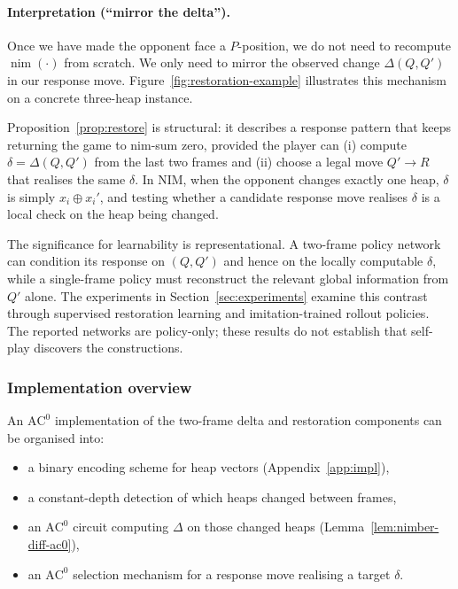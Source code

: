\documentclass[twoside,11pt]{article}
\newcommand{\AC}{\mathrm{AC}}
\numberwithin{theorem}{section}
\numberwithin{equation}{section}
\begin{document}
\paragraph{Interpretation (``mirror the delta'').}
Once we have made the opponent face a $P$-position, we do not need to recompute $\operatorname{nim}(\cdot)$ from scratch. We only need to mirror the observed change $\Delta(Q,Q')$ in our response move.
Figure~\ref{fig:restoration-example} illustrates this mechanism on a concrete three-heap instance.

Proposition~\ref{prop:restore} is structural: it describes a response pattern that keeps returning the game to nim-sum zero, provided the player can (i) compute $\delta=\Delta(Q,Q')$ from the last two frames and (ii) choose a legal move $Q'\to R$ that realises the same $\delta$. In NIM, when the opponent changes exactly one heap, $\delta$ is simply $x_i\oplus x_i'$, and testing whether a candidate response move realises $\delta$ is a local check on the heap being changed.

The significance for learnability is representational. A two-frame policy network can condition its response on $(Q,Q')$ and hence on the locally computable $\delta$, while a single-frame policy must reconstruct the relevant global information from $Q'$ alone. The experiments in Section~\ref{sec:experiments} examine this contrast through supervised restoration learning and imitation-trained rollout policies. The reported networks are policy-only; these results do not establish that self-play discovers the constructions.

\subsubsection{Implementation overview}
An $\AC^0$ implementation of the two-frame delta and restoration components can be organised into:
\begin{itemize}[leftmargin=*]
\item a binary encoding scheme for heap vectors (Appendix~\ref{app:impl}),
\item a constant-depth detection of which heaps changed between frames,
\item an $\AC^0$ circuit computing $\Delta$ on those changed heaps (Lemma~\ref{lem:nimber-diff-ac0}),
\item an $\AC^0$ selection mechanism for a response move realising a target $\delta$.
\end{itemize}

\end{document}
